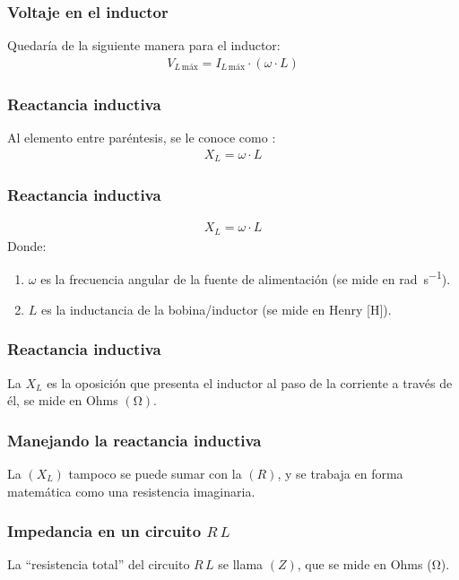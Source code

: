 \documentclass[14pt]{beamer}
\begin{document}
\begin{frame}
\frametitle{Voltaje en el inductor}
Quedaría de la siguiente manera para el inductor:
\pause
\begin{align*}
V_{L \, \text{máx}} = I_{L \, \text{máx}} \cdot \left( \omega \cdot L \right)
\end{align*}
\end{frame}
\begin{frame}
\frametitle{Reactancia inductiva}
Al elemento entre paréntesis, se le conoce como :
\pause
\begin{align*}
X_{L} = \omega \cdot L
\end{align*}
\end{frame}
\begin{frame}
\frametitle{Reactancia inductiva}
\vspace*{-1cm}
\begin{align*}
X_{L} = \omega \cdot L
\end{align*}
Donde:
\begin{enumerate}[<+->]
\item $\omega$ es la frecuencia angular de la fuente de alimentación (se mide en \si{\radian\per\second}).
\item $L$ es la inductancia de la bobina/inductor (se mide en Henry [\si{\henry}]).
\end{enumerate}
\end{frame}
\begin{frame}
\frametitle{Reactancia inductiva}
La  $X_{L}$ es la oposición que presenta el inductor al paso de la corriente a través de él, se mide en Ohms $(\si{\ohm})$.
\end{frame}
\begin{frame}
\frametitle{Manejando la reactancia inductiva}
La  $(X_{L})$ tampoco se puede sumar con la  $(R)$, y se trabaja en forma matemática como una resistencia imaginaria.
\end{frame}
\begin{frame}
\frametitle{Impedancia en un circuito $R \, L$}
La \enquote{resistencia total} del circuito $R \, L$ se llama  $(Z)$, que se mide en Ohms (\si{\ohm}).
\end{frame}
\end{document}
